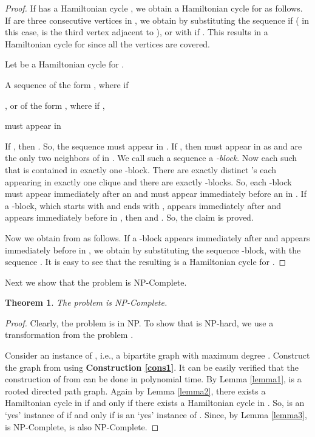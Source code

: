\documentclass[a4paper,12pt]{article}
\theoremstyle{plain}
\newtheorem{theorem}{Theorem}[section]
\theoremstyle{definition}
\theoremstyle{remark}
\begin{document}
\begin{proof}

If  has a Hamiltonian cycle , we obtain a Hamiltonian cycle
 for  as follows. If  are three consecutive
vertices in , we obtain  by substituting the sequence
 if
 ( in this case,  is the third vertex adjacent to
), or with  if
. This results in a Hamiltonian cycle for  since all
the vertices are covered.


Let  be a Hamiltonian cycle for .

 A sequence of the form , where  if

\hspace{1cm}, or of the form , where  if ,

\hspace{1cm}must appear in 


 If , then
.
So, the sequence 
must appear in . If , then  must
appear in  as  and  are the only two neighbors
of  in . We call such a sequence  a {\it -block}. Now
each  such that  is contained in exactly one
-block. There are exactly  distinct 's each appearing in
exactly one clique and there are exactly  -blocks. So, each
-block must appear immediately after an  and must appear
immediately before an  in . If a -block, which starts
with  and ends with ,  appears immediately after
 and appears immediately before  in , then 
and . So, the claim is proved.

Now we obtain  from  as follows. If a -block appears
immediately after  and appears immediately before  in
, we obtain  by substituting the sequence -block, with the sequence . It is easy  to see that the resulting  is a
Hamiltonian cycle for .



\end{proof}
Next we show that the problem  is NP-Complete.

\begin{theorem}
The problem  is NP-Complete.
\end{theorem}
\begin{proof}
Clearly, the problem  is in NP. To show that  is
NP-hard, we use a transformation from the problem .

Consider an instance of , i.e., a bipartite graph 
with maximum degree . Construct the graph  from 
using {\bf Construction \ref{cons1}}. It can be easily verified that
the construction of  from  can be done in polynomial time. By
Lemma \ref{lemma1},  is a rooted directed path graph. Again by
Lemma \ref{lemma2}, there exists a Hamiltonian cycle in  if and
only if there exists a Hamiltonian cycle in . So,  is an `yes'
instance of  if and only if  is an `yes' instance of
. Since, by Lemma \ref{lemma3},  is NP-Complete, 
is also NP-Complete.

\end{proof}
\end{document}
